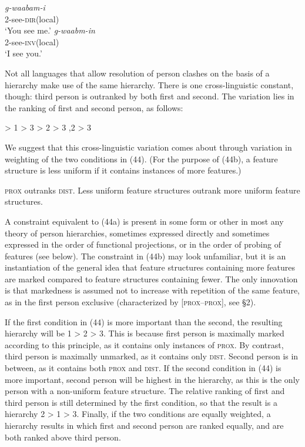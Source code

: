\documentclass[output=paper]{langsci/langscibook}
\begin{document}
\ea 
  \ea
 \gll     \textit{g-waabam-i}      \\
           \textsc{2}-see-\textsc{dir}(local)  \\
 \glt      ‘You see me.’
 \ex
   \gll  \textit{g-waabm-in}\\
         \textsc{2}-see-\textsc{inv}(local)\\
   \glt   ‘I see you.’
\z
  \z

Not all languages that allow resolution of person clashes on the basis of a hierarchy make use of the same hierarchy. There is one cross-linguistic constant, though: third person is outranked by both first and second. The variation lies in the ranking of first and second person, as follows:

\ea \settowidth{}
 > 1 > 3  
 > 2 > 3  
,2 > 3    
\z
\z

We suggest that this cross-linguistic variation comes about through variation in weighting of the two conditions in (44). (For the purpose of (44b), a feature structure is less uniform if it contains instances of more features.)

\ea \label{bkm:Ref453928502}  
\ea  \textsc{prox} outranks \textsc{dist}.
\ex  Less uniform feature structures outrank more uniform feature structures.
\z
\z

A constraint equivalent to (44a) is present in some form or other in most any theory of person hierarchies, sometimes expressed directly and sometimes expressed in the order of functional projections, or in the order of probing of features (see below). The constraint in (44b) may look unfamiliar, but it is an instantiation of the general idea that feature structures containing more features are marked compared to feature structures containing fewer. The only innovation is that markedness is assumed not to increase with repetition of the same feature, as in the first person exclusive (characterized by [\textsc{prox}–\textsc{prox}], see §2).

If the first condition in (44) is more important than the second, the resulting hierarchy will be 1 > 2 > 3. This is because first person is maximally marked according to this principle, as it contains only instances of \textsc{prox}. By contrast, third person is maximally unmarked, as it contains only \textsc{dist}. Second person is in between, as it contains both \textsc{prox} and \textsc{dist}. If the second condition in (44) is more important, second person will be highest in the hierarchy, as this is the only person with a non-uniform feature structure. The relative ranking of first and third person is still determined by the first condition, so that the result is a hierarchy 2 > 1 > 3. Finally, if the two conditions are equally weighted, a hierarchy results in which first and second person are ranked equally, and are both ranked above third person.
\end{document}
